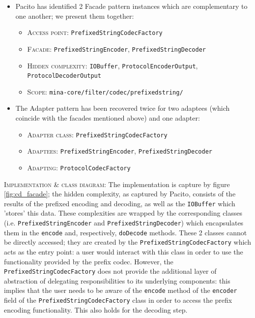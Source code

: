 \begin{itemize}
    \item Pacito has identified 2 Facade pattern instances which are complementary to one another; we present them together:
        \begin{itemize}
            \item \textsc{Access point}: \texttt{PrefixedStringCodecFactory}
            \item \textsc{Facade}: \texttt{PrefixedStringEncoder}, \texttt{PrefixedStringDecoder}
            \item \textsc{Hidden complexity}: \texttt{IOBuffer}, \texttt{ProtocolEncoderOutput}, \texttt{ProtocolDecoderOutput}
            \item \textsc{Scope}: \texttt{mina-core/filter/codec/prefixedstring/}
        \end{itemize}
    \item The Adapter pattern has been recovered twice for two adaptees (which coincide with the facades mentioned above) and one adapter:
        \begin{itemize}
            \item \textsc{Adapter class}: \texttt{PrefixedStringCodecFactory}
            \item \textsc{Adaptees}: \texttt{PrefixedStringEncoder}, \texttt{PrefixedStringDecoder}
            \item \textsc{Adapting}: \texttt{ProtocolCodecFactory}
        \end{itemize}
\end{itemize}
\textsc{Implementation \& class diagram}: The implementation is capture by figure \ref{fig:cd_facade}; the hidden complexity, as captured by Pacito, consists of the results of the prefixed encoding and decoding, as well as the \texttt{IOBuffer} which 'stores' this data. These complexities are wrapped by the corresponding classes (i.e. \texttt{PrefixedStringEncoder} and \texttt{PrefixedStringDecoder}) which encapsulates them in the \texttt{encode} and, respectively, \texttt{doDecode} methods. These 2 classes cannot be directly accessed; they are created by the \texttt{PrefixedStringCodecFactory} which acts as the entry point: a user would interact with this class in order to use the functionality provided by the prefix codec. However, the \texttt{PrefixedStringCodecFactory} does not provide the additional layer of abstraction of delegating responsibilities to its underlying components: this implies that the user needs to be aware of the \texttt{encode} method of the \texttt{encoder} field of the \texttt{PrefixedStringCodecFactory} class in order to access the prefix encoding functionality. This also holds for the decoding step. \\\\
